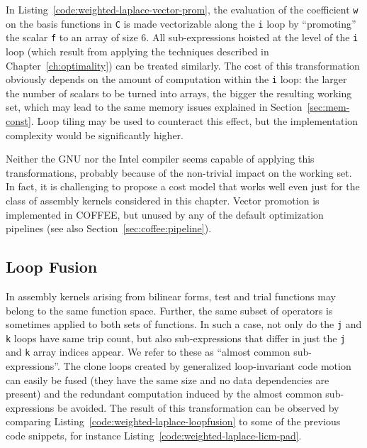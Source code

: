In Listing~\ref{code:weighted-laplace-vector-prom}, the evaluation of the coefficient \texttt{w} on the basis functions in {\tt C} is made vectorizable along the {\tt i} loop by ``promoting'' the scalar \texttt{f} to an array of size 6. All sub-expressions hoisted at the level of the {\tt i} loop (which result from applying the techniques described in Chapter~\ref{ch:optimality}) can be treated similarly. The cost of this transformation obviously depends on the amount of computation within the {\tt i} loop: the larger the number of scalars to be turned into arrays, the bigger the resulting working set, which may lead to the same memory issues explained in Section~\ref{sec:mem-const}. Loop tiling may be used to counteract this effect, but the implementation complexity would be significantly higher. 

Neither the GNU nor the Intel compiler seems capable of applying this transformations, probably because of the non-trivial impact on the working set. In fact, it is challenging to propose a cost model that works well even just for the class of assembly kernels considered in this chapter. Vector promotion is implemented in COFFEE, but unused by any of the default optimization pipelines (see also Section~\ref{sec:coffee:pipeline}).

\subsection{Loop Fusion}
\label{sec:coffee-loopfusion}

In assembly kernels arising from bilinear forms, test and trial functions may belong to the same function space. Further, the same subset of operators is sometimes applied to both sets of functions. In such a case, not only do the {\tt j} and {\tt k} loops have same trip count, but also sub-expressions that differ in just the {\tt j} and {\tt k} array indices appear. We refer to these as ``almost common sub-expressions''. The clone loops created by generalized loop-invariant code motion can easily be fused (they have the same size and no data dependencies  are present) and the redundant computation induced by the almost common sub-expressions be avoided. The result of this transformation can be observed by comparing Listing~\ref{code:weighted-laplace-loopfusion} to some of the previous code snippets, for instance Listing~\ref{code:weighted-laplace-licm-pad}.

